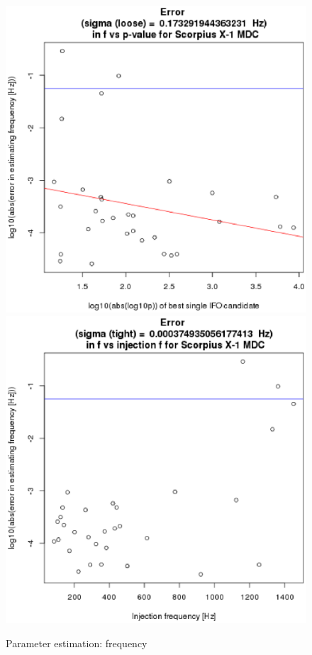 \begin{figure}
\begin{center}
\includegraphics[width=0.3\paperwidth,height=0.2\paperheight]{ErrorF.eps}
\includegraphics[width=0.3\paperwidth,height=0.2\paperheight]{ErrorFvsF.eps}
\caption{Parameter estimation: frequency
}
\end{center}
\end{figure}



